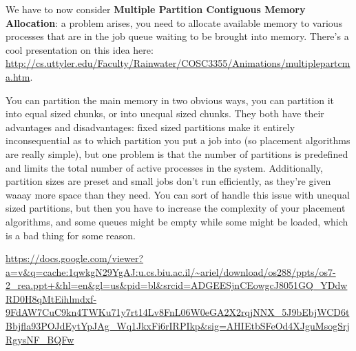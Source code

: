 \documentclass{article}
\begin{document}
We have to now consider { \bf Multiple Partition Contiguous Memory Allocation}: a problem arises, you need to allocate available memory to various processes that are in the job queue waiting to be brought into memory. There's a cool presentation on this idea here: \url{http://cs.uttyler.edu/Faculty/Rainwater/COSC3355/Animations/multiplepartcma.htm}. 

You can partition the main memory in two obvious ways, you can partition it into equal sized chunks, or into unequal sized chunks. They both have their advantages and disadvantages: fixed sized partitions make it entirely inconsequential as to which partition you put a job into (so placement algorithms are really simple), but one problem is that the number of partitions is predefined and limits the total number of active
processes in the system. Additionally, partition sizes are preset and small jobs don't run efficiently, as they're given waaay more space than they need. You can sort of handle this issue with unequal sized partitions, but then you have to increase the complexity of your placement algorithms, and some queues might be empty while some might be loaded, which is a bad thing for some reason.




\url{https://docs.google.com/viewer?a=v&q=cache:1qwkgN29YgAJ:u.cs.biu.ac.il/~ariel/download/os288/ppts/os7-2_rea.ppt+&hl=en&gl=us&pid=bl&srcid=ADGEESjnCEowgcJ8051GQ_YDdwRD0H8qMtEihlmdxf-9FdAW7CuC9kn4TWKu71y7rt14Lv8FnL06W0eGA2X2rqjNNX_5J9bEbjWCD6tBbjfla93POJdEytYpJAg_Wq1JkxFi6rIRPIkp&sig=AHIEtbSFeOd4XJguMsogSrjRgysNF_BQFw}
\end{document}
